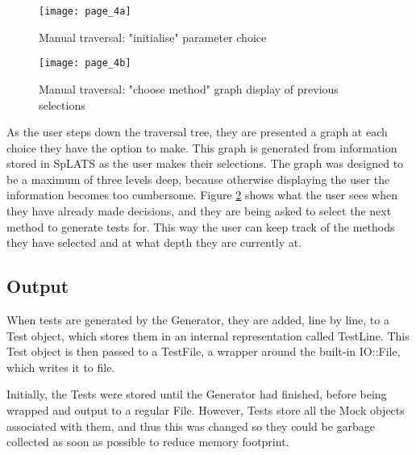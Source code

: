   \begin{figure}
    \centering
    \texttt{[image: page\_4a]}
    \caption{Manual traversal: "initialise" parameter choice}
    \label{fig:GUI_Page4a}
  \end{figure}
  
  \begin{figure}
    \centering
    \texttt{[image: page\_4b]}
    \caption{Manual traversal: "choose method" graph display of previous selections}
    \label{fig:GUI_Page4b}
  \end{figure}
  
  As the user steps down the traversal tree, they are presented a graph at each choice they have the option to make. This graph is generated from information stored in SpLATS as the user makes their selections. The graph was designed to be a maximum of three levels deep, because otherwise displaying the user the information becomes too cumbersome. Figure \ref{fig:GUI_Page4b} shows what the user sees when they have already made decisions, and they are being asked to select the next method to generate tests for. This way the user can keep track of the methods they have selected and at what depth they are currently at.

  \subsection{Output}
    When tests are generated by the Generator, they are added, line by line, to a Test object, which stores them in an internal representation called TestLine.
    This Test object is then passed to a TestFile, a wrapper around the built-in IO::File, which writes it to file.

    Initially, the Tests were stored until the Generator had finished, before being wrapped and output to a regular File.
    However, Tests store all the Mock objects associated with them, and thus this was changed so they could be garbage collected as soon as possible to reduce memory footprint.
    
    
